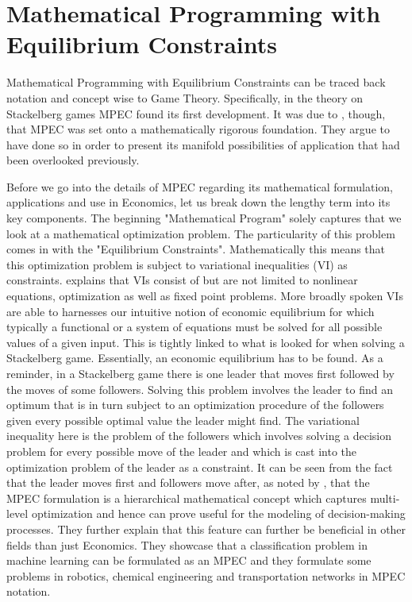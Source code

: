\section{Mathematical Programming with Equilibrium Constraints} \label{generalMPEC}
\thispagestyle{plain} %

Mathematical Programming with Equilibrium Constraints can be traced back notation and concept wise to Game Theory. Specifically, in the theory on Stackelberg games MPEC found its first development. It was due to \cite{Luo.Pang.Ralph.1996}, though, that MPEC was set onto a mathematically rigorous foundation. They argue to have done so in order to present its manifold possibilities of application that had been overlooked previously.

Before we go into the details of MPEC regarding its mathematical formulation, applications and use in Economics, let us break down the lengthy term into its key components. The beginning "Mathematical Program" solely captures that we look at a mathematical optimization problem. The particularity of this problem comes in with the "Equilibrium Constraints". Mathematically this means that this optimization problem is subject to variational inequalities (VI) as constraints. \cite{Nagurney.1993} explains that VIs consist of but are not limited to nonlinear equations, optimization as well as fixed point problems. More broadly spoken VIs are able to harnesses our intuitive notion of economic equilibrium for which typically a functional or a system of equations must be solved for all possible values of a given input. This is tightly linked to what is looked for when solving a Stackelberg game. Essentially, an economic equilibrium has to be found. As a reminder, in a Stackelberg game there is one leader that moves first followed by the moves of some followers. Solving this problem involves the leader to find an optimum that is in turn subject to an optimization procedure of the followers given every possible optimal value the leader might find. The variational inequality here is the problem of the followers which involves solving a decision problem for every possible move of the leader and which is cast into the optimization problem of the leader as a constraint. It can be seen from the fact that the leader moves first and followers move after, as noted by \cite{Luo.Pang.Ralph.1996}, that the MPEC formulation is a hierarchical mathematical concept which captures multi-level optimization and hence can prove useful for the modeling of decision-making processes. They further explain that this feature can further be beneficial in other fields than just Economics. They showcase that a classification problem in machine learning can be formulated as an MPEC and they formulate some problems in robotics, chemical engineering and transportation networks in MPEC notation.

